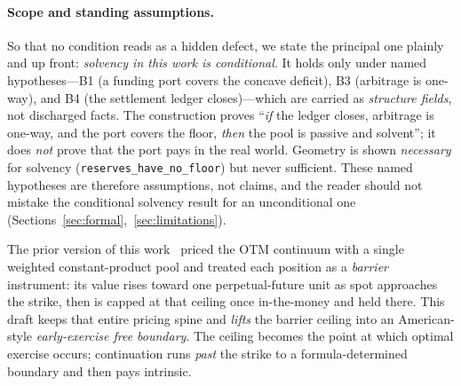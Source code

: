 \documentclass[11pt]{article}
\begin{document}
\paragraph{Scope and standing assumptions.}
So that no condition reads as a hidden defect, we state the principal one plainly
and up front: \emph{solvency in this work is conditional}. It holds only under
named hypotheses---B1 (a funding port covers the concave deficit), B3 (arbitrage
is one-way), and B4 (the settlement ledger closes)---which are carried as
\emph{structure fields}, not discharged facts. The construction proves ``\emph{if}
the ledger closes, arbitrage is one-way, and the port covers the floor, \emph{then}
the pool is passive and solvent''; it does \emph{not} prove that the port pays in
the real world. Geometry is shown \emph{necessary} for solvency
(\texttt{reserves\_have\_no\_floor}) but never sufficient. These named hypotheses
are therefore assumptions, not claims, and the reader should not mistake the
conditional solvency result for an unconditional one
(Sections~\ref{sec:formal},~\ref{sec:limitations}).

The prior version of this work~\cite{temporal-barrier} priced the OTM continuum
with a single weighted constant-product pool and treated each position as a
\emph{barrier} instrument: its value rises toward one perpetual-future unit as
spot approaches the strike, then is capped at that ceiling once in-the-money and
held there. This draft keeps that entire pricing spine and \emph{lifts} the
barrier ceiling into an American-style \emph{early-exercise free boundary}. The
ceiling becomes the point at which optimal exercise occurs; continuation runs
\emph{past} the strike to a formula-determined boundary and then pays intrinsic.
\end{document}
